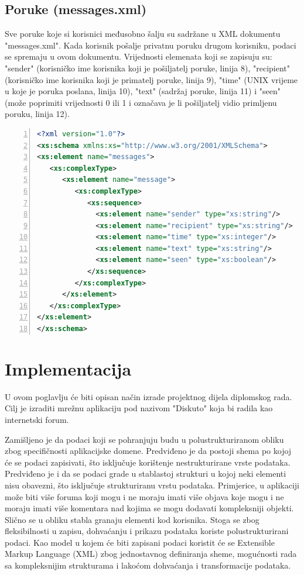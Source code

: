 \documentclass{foi}
\begin{document}
\section{Poruke (messages.xml)}

Sve poruke koje si korisnici međusobno šalju su sadržane u XML dokumentu "messages.xml". Kada korisnik pošalje privatnu poruku drugom korisniku, podaci se spremaju u ovom dokumentu. Vrijednosti elemenata koji se zapisuju su: "sender" (korisničko ime korisnika koji je pošiljatelj poruke, linija 8), "recipient" (korisničko ime korisnika koji je primatelj poruke, linija 9), "time" (UNIX vrijeme u koje je poruka poslana, linija 10), "text" (sadržaj poruke, linija 11) i "seen" (može poprimiti vrijednosti 0 ili 1 i označava je li pošiljatelj vidio primljenu poruku, linija 12).

\begin{lstlisting}[language=XML, numbers=left, caption=XML Schema za dokument "messages.xml", captionpos=b]
 <?xml version="1.0"?>
<xs:schema xmlns:xs="http://www.w3.org/2001/XMLSchema">
<xs:element name="messages">
   <xs:complexType>
      <xs:element name="message">
         <xs:complexType>
            <xs:sequence>
              <xs:element name="sender" type="xs:string"/>
              <xs:element name="recipient" type="xs:string"/>
              <xs:element name="time" type="xs:integer"/>
              <xs:element name="text" type="xs:string"/>
              <xs:element name="seen" type="xs:boolean"/>
            </xs:sequence>
         </xs:complexType>
      </xs:element>
   </xs:complexType>
</xs:element>
</xs:schema> 
\end{lstlisting}

\chapter{Implementacija}

U ovom poglavlju će biti opisan način izrade projektnog dijela diplomskog rada. Cilj je izraditi mrežnu aplikaciju pod nazivom "Diskuto" koja bi radila kao internetski forum. 

Zamišljeno je da podaci koji se pohranjuju budu u polustrukturiranom obliku zbog specifičnosti aplikacijske domene. Predviđeno je da postoji shema po kojoj će se podaci zapisivati, što isključuje korištenje nestrukturirane vrste podataka. Predviđeno je i da se podaci grade u stablastoj strukturi u kojoj neki elementi nisu obavezni, što isključuje strukturiranu vrstu podataka. Primjerice, u aplikaciji može biti više foruma koji mogu i ne moraju imati više objava koje mogu i ne moraju imati više komentara nad kojima se mogu dodavati kompleksniji objekti. Slično se u obliku stabla granaju elementi kod korisnika. Stoga se zbog fleksibilnosti u zapisu, dohvaćanju i prikazu podataka koriste polustrukturirani podaci. Kao model u kojem će biti zapisani podaci koristit će se Extensible Markup Language (XML) zbog jednostavnog definiranja sheme, mogućnosti rada sa kompleksnijim strukturama i lakoćom dohvaćanja i transformacije podataka. 
\end{document}
